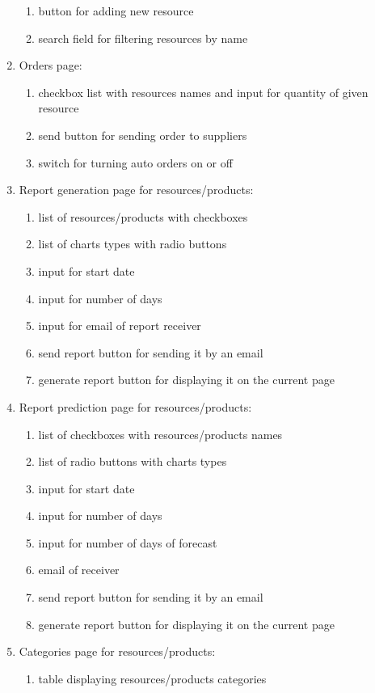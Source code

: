 \documentclass[a4paper,11pt,twoside]{report}
\theoremstyle{definition}
\begin{document}
\begin{enumerate}
\begin{enumerate}
\item button for adding new resource
\item search field for filtering resources by name
\end{enumerate} 
\item Orders page:
\begin{enumerate}
\item checkbox list with resources names and input for quantity of given resource
\item send button for sending order to suppliers
\item switch for turning auto orders on or off
\end{enumerate}
\item Report generation page for resources/products:
\begin{enumerate}
\item list of resources/products with checkboxes
\item list of charts types with radio buttons
\item input for start date
\item input for number of days 
\item input for email of  report receiver
\item send report button for sending it by an email
\item generate report button for displaying it on the current page
\end{enumerate}
\item Report prediction page for resources/products:
\begin{enumerate}
\item list of  checkboxes with resources/products names
\item list of radio buttons with charts types
\item input for start date
\item input for number of days
\item input for number of days of forecast
\item email of receiver
\item send report button for sending it by an email
\item generate report button for displaying it on the current page
\end{enumerate}
\item Categories page for resources/products:
\begin{enumerate}
\item table displaying resources/products categories

\end{enumerate}
\end{enumerate}
\end{document}
